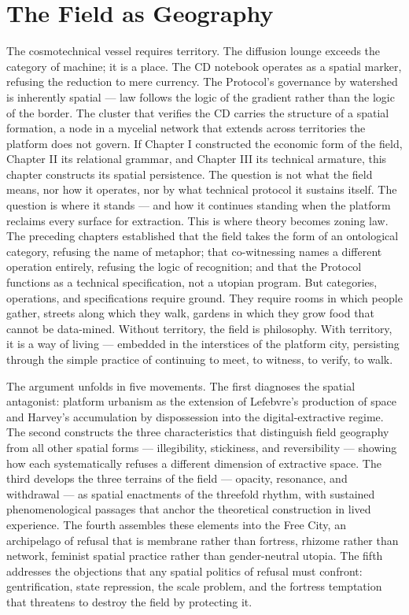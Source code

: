 \chapter{The Field as Geography}
\label{ch:05}



The cosmotechnical vessel requires territory. The diffusion lounge exceeds the category of machine; it is a place. The CD notebook operates as a spatial marker, refusing the reduction to mere currency. The  Protocol’s governance by watershed is inherently spatial — law follows the logic of the gradient rather than the logic of the border. The cluster that verifies the CD carries the structure of a spatial formation, a node in a mycelial network that extends across territories the platform does not govern. If Chapter I constructed the economic form of the field, Chapter II its relational grammar, and Chapter III its technical armature, this chapter constructs its spatial persistence. The question is not what the field means, nor how it operates, nor by what technical protocol it sustains itself. The question is where it stands — and how it continues standing when the platform reclaims every surface for extraction. This is where theory becomes zoning law. The preceding chapters established that the field takes the form of an ontological category, refusing the name of metaphor; that co-witnessing names a different operation entirely, refusing the logic of recognition; and that the   Protocol functions as a technical specification, not a utopian program. But categories, operations, and specifications require ground. They require rooms in which people gather, streets along which they walk, gardens in which they grow food that cannot be data-mined. Without territory, the field is philosophy. With territory, it is a way of living — embedded in the interstices of the platform city, persisting through the simple practice of continuing to meet, to witness, to verify, to walk.

The argument unfolds in five movements. The first diagnoses the spatial antagonist: platform urbanism as the extension of Lefebvre’s production of space and Harvey’s accumulation by dispossession into the digital-extractive regime. The second constructs the three characteristics that distinguish field geography from all other spatial forms — illegibility, stickiness, and reversibility — showing how each systematically refuses a different dimension of extractive space. The third develops the three terrains of the field — opacity, resonance, and withdrawal — as spatial enactments of the threefold rhythm, with sustained phenomenological passages that anchor the theoretical construction in lived experience. The fourth assembles these elements into the Free City, an archipelago of refusal that is membrane rather than fortress, rhizome rather than network, feminist spatial practice rather than gender-neutral utopia. The fifth addresses the objections that any spatial politics of refusal must confront: gentrification, state repression, the scale problem, and the fortress temptation that threatens to destroy the field by protecting it.

